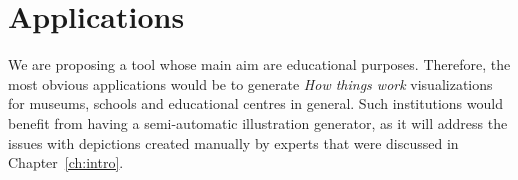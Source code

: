 \chapter{Applications}

We are proposing a tool whose main aim are educational purposes.
Therefore, the most obvious applications would be to generate \textit{How things work} visualizations for museums, schools and educational centres in general.
Such institutions would benefit from having a semi-automatic illustration generator, as it will address the issues with depictions created manually by experts that were discussed in Chapter~\ref{ch:intro}.

